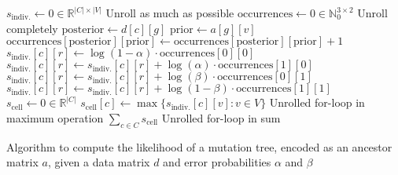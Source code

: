\begin{algorithm}[p]
    \begin{algorithmic}
            \State $s_\mathrm{indiv.} \leftarrow 0 \in \mathbb{R}^{|C| \times |V|}$
             \Comment Unroll as much as possible
                \State $\mathrm{occurrences} \leftarrow 0 \in \mathbb{N}_0^{3 \times 2}$
                 \Comment Unroll completely
                    \State $\mathrm{posterior} \leftarrow d[c][g]$
                    \State $\mathrm{prior} \leftarrow a[g][v]$
                    \State $\mathrm{occurrences}[\mathrm{posterior}][\mathrm{prior}] \leftarrow \mathrm{occurrences}[\mathrm{posterior}][\mathrm{prior}] + 1$
                \EndFor
                \State $s_\mathrm{indiv.}[c][r] \leftarrow \log(1-\alpha) \cdot \mathrm{occurrences}[0][0]$
                \State $s_\mathrm{indiv.}[c][r] \leftarrow s_\mathrm{indiv.}[c][r] + \log(\alpha) \cdot \mathrm{occurrences}[1][0]$
                \State $s_\mathrm{indiv.}[c][r] \leftarrow s_\mathrm{indiv.}[c][r] + \log(\beta) \cdot \mathrm{occurrences}[0][1]$
                \State $s_\mathrm{indiv.}[c][r] \leftarrow s_\mathrm{indiv.}[c][r] + \log(1-\beta) \cdot \mathrm{occurrences}[1][1]$
            \EndFor
            \State $s_\mathrm{cell} \leftarrow 0 \in \mathbb{R}^{|C|}$
                \State $s_\mathrm{cell}[c] \leftarrow \max \{s_\mathrm{indiv.}[c][v] : v \in V\}$ \Comment Unrolled for-loop in maximum operation
            \EndFor
            \State \Return $\sum_{c \in C} s_\mathrm{cell}$ \Comment Unrolled for-loop in sum
        \EndFunction
    \end{algorithmic}
    \label{alg:likelihood}
    \caption{Algorithm to compute the likelihood of a mutation tree, encoded as an ancestor matrix $a$, given a data matrix $d$ and error probabilities $\alpha$ and $\beta$}
\end{algorithm}